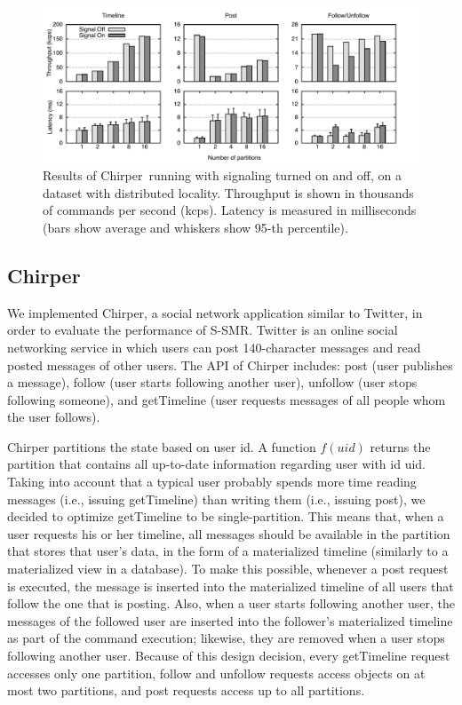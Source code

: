 \documentclass[11pt]{article}
\newcommand{\ssmr}{\mbox{S-SMR}}
\newcommand{\appname}{Chirper} %
\begin{document}
\begin{figure}
\begin{minipage}[b]{1\linewidth} %
\centering
      \includegraphics[width=1\linewidth]{figures/sc-at-scale-locality}
\end{minipage}
\caption{Results of \appname\ running with signaling turned on and off, on a dataset with distributed locality. Throughput is shown in thousands of commands per second (kcps). Latency is measured in milliseconds (bars show average and whiskers show 95-th percentile).}
\label{fig:perf}
\end{figure}

\subsection{\appname}
We implemented \appname{}, a social network application similar to Twitter, in order to evaluate the performance of \ssmr{}.
Twitter is an online social networking service in which users can post 140-character messages and read posted messages of other users.
The API of \appname{} includes: post (user publishes a message), follow (user starts following another user), unfollow (user stops following someone), and getTimeline (user requests messages of all people whom the user follows).

\appname{} partitions the state based on user id. A function $f(uid)$ returns the partition that contains all up-to-date information regarding user with id uid. Taking into account that a typical user probably spends more time reading messages (i.e., issuing getTimeline) than writing them (i.e., issuing post), we decided to optimize getTimeline to be single-partition. This means that, when a user requests his or her timeline, all messages should be available in the partition that stores that user's data, in the form of a materialized timeline (similarly to a materialized view in a database). To make this possible, whenever a post request is executed, the message is inserted into the materialized timeline of all users that follow the one that is posting. Also, when a user starts following another user, the messages of the followed user are inserted into the follower's materialized timeline as part of the command execution; likewise, they are removed when a user stops following another user. Because of this design decision, every getTimeline request accesses only one partition, follow and unfollow requests access objects on at most two partitions, and post requests access up to all partitions.
\end{document}
